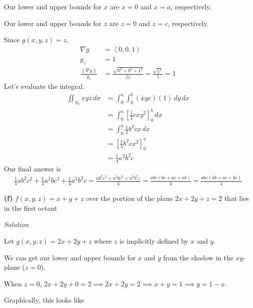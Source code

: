 \documentclass{article}
\newcommand{\lrp}[1]{\left( #1 \right)}
\newcommand{\lra}[1]{\left\langle #1 \right\rangle}
\newcommand{\lrb}[1]{\left[ #1 \right]}
\newcommand{\norm}[1]{\left\lVert #1 \right\rVert}
\newcommand{\Solution}{\textit{Solution}}
\begin{document}
Our lower and upper bounds for $x$ are $x=0$ and $x=a$, respectively.

Our lower and upper bounds for $z$ are $z=0$ and $z=c$, respectively.

Since $g(x,y,z)=z$,
\begin{align*}
    \nabla g &=\lra{0,0,1}\\
    g_z&=1\\
    \frac{\norm{\nabla g}}{g_z}&=\frac{\sqrt{0^2+0^2+1^2}}{\left|1\right|}=\frac{\sqrt{1^2}}{1}=1
\end{align*}
Let's evaluate the integral.
\begin{align*}
    \iint_{S_3}xyz\,d\sigma &=\int_0^a\int_0^b \lrp{xyc}\lrp{1}\,dy\,dx\\
    &=\int_0^a \lrb{\frac{1}{2}cxy^2}_0^b\,dx\\
    &=\int_0^a \frac{1}{2}b^2cx\,dx\\
    &=\lrb{\frac{1}{4}b^2cx^2}_0^a\\
    &=\frac{1}{4}a^2b^2c
\end{align*}
Our final answer is
\begin{align*}
    \frac{1}{4}ab^2c^2+\frac{1}{4}a^2bc^2+\frac{1}{4}a^2b^2c=\frac{ab^2c^2+a^2bc^2+a^2b^2c}{4}=\frac{abc(bc+ac+ab)}{4}=\boxed{\frac{abc(ab+ac+bc)}{4}}
\end{align*}

{}\textbf{(f)} $f(x,y,z)=x+y+z$ over the portion of the plane $2x+2y+z=2$ that lies in the first octant

\Solution

Let $g(x,y,z)=2x+2y+z$ where $z$ is implicitly defined by $x$ and $y$. 

We can get our lower and upper bounds for $x$ and $y$ from the shadow in the $xy$-plane ($z=0$).

When $z=0$, $2x+2y+0=2\implies 2x+2y=2\implies x+y=1\implies y=1-x$.

Graphically, this looks like
\begin{center}
\end{center}
\end{document}
